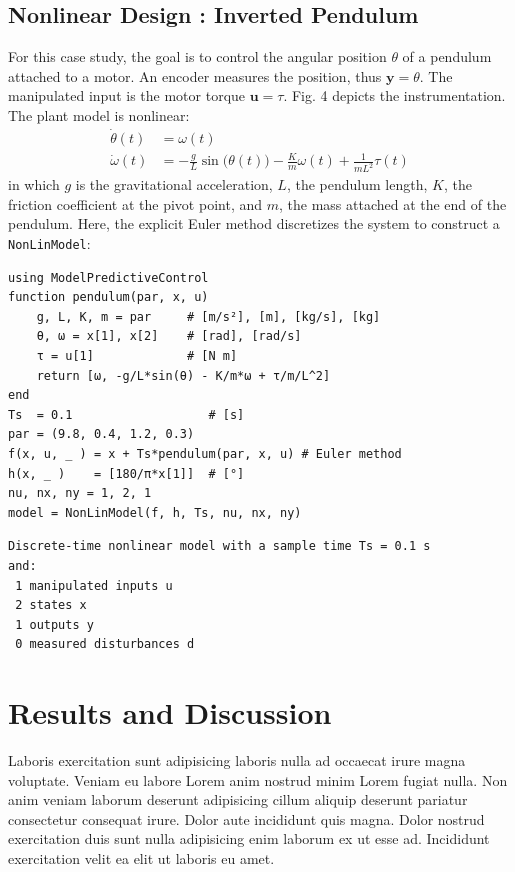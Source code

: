 \subsection{Nonlinear Design : Inverted Pendulum}

For this case study, the goal is to control the angular position $\theta$ of a pendulum attached to a motor. An encoder measures the position, thus $\mathbf{y} = \theta$. The manipulated input is the motor torque $\mathbf{u} = \tau$. Fig. 4 depicts the instrumentation. The plant model is nonlinear:
\begin{subequations}
\begin{align}
\dot{\theta}(t) &= \omega(t) \\
\dot{\omega}(t) &= -\frac{g}{L}\sin\big(\theta(t)\big) -\frac{K}{m}\omega(t) + \frac{1}{m L^2}\tau(t)
\end{align}
\end{subequations}
in which $g$ is the gravitational acceleration, $L$, the pendulum length, $K$, the friction coefficient at the pivot point, and $m$, the mass attached at the end of the pendulum. Here, the explicit Euler method discretizes the system to construct a \texttt{NonLinModel}:
\begin{verbatim}
using ModelPredictiveControl
function pendulum(par, x, u)
    g, L, K, m = par     # [m/s²], [m], [kg/s], [kg]
    θ, ω = x[1], x[2]    # [rad], [rad/s]
    τ = u[1]             # [N m]
    return [ω, -g/L*sin(θ) - K/m*ω + τ/m/L^2]
end
Ts  = 0.1                   # [s]
par = (9.8, 0.4, 1.2, 0.3)
f(x, u, _ ) = x + Ts*pendulum(par, x, u) # Euler method
h(x, _ )    = [180/π*x[1]]  # [°]
nu, nx, ny = 1, 2, 1
model = NonLinModel(f, h, Ts, nu, nx, ny)
\end{verbatim}
\spacerepl
\begin{verbatim}
Discrete-time nonlinear model with a sample time Ts = 0.1 s
and:
 1 manipulated inputs u
 2 states x
 1 outputs y
 0 measured disturbances d
\end{verbatim}

\section{Results and Discussion}
\label{sec.results_simple}

Laboris exercitation sunt adipisicing laboris nulla ad occaecat irure magna voluptate. Veniam eu labore Lorem anim nostrud minim Lorem fugiat nulla. Non anim veniam laborum deserunt adipisicing cillum aliquip deserunt pariatur consectetur consequat irure. Dolor aute incididunt quis magna. Dolor nostrud exercitation duis sunt nulla adipisicing enim laborum ex ut esse ad. Incididunt exercitation velit ea elit ut laboris eu amet.

